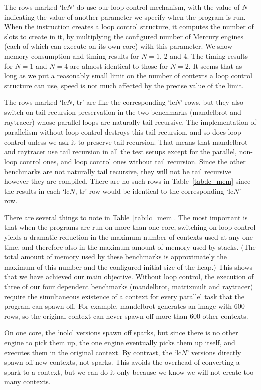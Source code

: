 The rows marked `lc$N$' do use our loop control mechanism,
with the value of $N$ indicating
the value of another parameter we specify when the program is run.
When the  instruction
creates a loop control structure,
it computes the number of slots to create in it,
by multiplying the configured number of Mercury engines
(each of which can execute on its own core)
with this parameter.
We show memory consumption and timing results for $N=1$, 2 and 4.
The timing results for $N=1$ and $N=4$ are almost identical to those for
$N=2$.
It seems that as long as we put a reasonably small limit
on the number of contexts a loop control structure can use,
speed is not much affected by the precise value of the limit.

The rows marked `lc$N$, tr' are like the corresponding `lc$N$' rows,
but they also switch on tail recursion preservation
in the two benchmarks (mandelbrot and raytracer)
whose parallel loops are naturally tail recursive.
The implementation of parallelism without loop control
destroys this tail recursion,
and so does loop control unless we ask it to preserve tail recursion.
That means that mandelbrot and raytracer use tail recursion
in all the test setups except for
the parallel, non-loop control ones,
and loop control ones without tail recursion.
Since the other benchmarks are not naturally tail recursive,
they will not be tail recursive however they are compiled.
There are no such rows in Table~\ref{tab:lc_mem}
since the results in each `lc$N$, tr' row
would be identical to the corresponding `lc$N$' row.

There are several things to note in Table~\ref{tab:lc_mem}.
The most important is that when the programs are run on more than one core,
switching on loop control yields a dramatic reduction
in the maximum number of contexts used at any one time,
and therefore also in the maximum amount of memory used by stacks.
(The total amount of memory used by these benchmarks
is approximately the maximum of this number
and the configured initial size of the heap.)
This shows that we have achieved our main objective.
Without loop control, the execution of
three of our four dependent benchmarks (mandelbrot, matrixmult and raytracer)
require the simultaneous existence of a context
for every parallel task that the program can spawn off.
For example, mandelbrot generates an image with 600 rows,
so the original context can never spawn off more than 600 other contexts.

On one core, the `nolc' versions spawn off sparks,
but since there is no other engine to pick them up,
the one engine eventually picks them up itself,
and executes them in the original context.
By contrast, the `lc$N$' versions directly spawn off new contexts, not sparks.
This avoids the overhead of converting a spark to a context,
but we can do it only because we know we will not create too many contexts.

